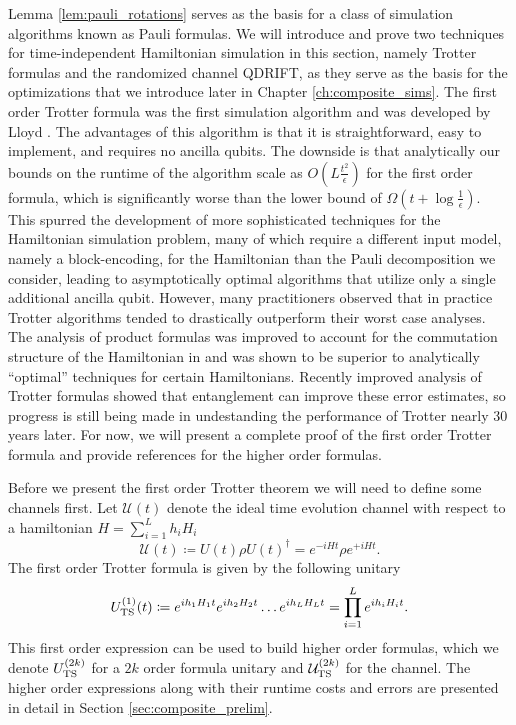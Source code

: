 Lemma \ref{lem:pauli_rotations} serves as the basis for a class of simulation algorithms known as Pauli formulas.
We will introduce and prove two techniques for time-independent Hamiltonian simulation in this section, namely Trotter formulas and the randomized channel QDRIFT, as they serve as the basis for the optimizations that we introduce later in Chapter \ref{ch:composite_sims}.
The first order Trotter formula was the first simulation algorithm and was developed by Lloyd \cite{lloyd1996universal}. 
The advantages of this algorithm is that it is straightforward, easy to implement, and requires no ancilla qubits. 
The downside is that analytically our bounds on the runtime of the algorithm scale as $O\left( L \frac{t^2}{\epsilon}\right)$ for the first order formula, which is significantly worse than the lower bound of $\Omega\left(t + \log \frac{1}{\epsilon} \right)$. 
This spurred the development of more sophisticated techniques for the Hamiltonian simulation problem, many of which require a different input model, namely a block-encoding, for the Hamiltonian than the Pauli decomposition we consider, leading to asymptotically optimal algorithms \cite{low2019hamiltonian} that utilize only a single additional ancilla qubit. However, many practitioners observed that in practice Trotter algorithms tended to drastically outperform their worst case analyses. The analysis of product formulas was improved to account for the commutation structure of the Hamiltonian in \cite{childs2021theory} and was shown to be superior to analytically ``optimal'' techniques for certain Hamiltonians. Recently improved analysis of Trotter formulas showed that entanglement can improve these error estimates, so progress is still being made in undestanding the performance of Trotter nearly 30 years later. For now, we will present a complete proof of the first order Trotter formula and provide references for the higher order formulas.

Before we present the first order Trotter theorem we will need to define some channels first. Let $\mathcal{U}(t)$ denote the ideal time evolution channel with respect to a hamiltonian $H = \sum_{i = 1}^L h_i H_i$
\begin{equation}
    \mathcal{U}(t) \coloneqq U(t) \rho U(t)^\dagger = e^{-i H t} \rho e^{+i H t}.
\end{equation}
The first order Trotter formula is given by the following unitary
\begin{equation}
    U_{\rm TS}^{(1)}(t) \coloneqq e^{i h_1 H_1 t}e^{i h_2 H_2 t} \ldots e^{i h_L H_L t} = \prod_{i = 1}^L e^{i h_i H_i t}.
\end{equation}
This first order expression can be used to build higher order formulas, which we denote $U_{\rm TS}^{(2k)}$ for a $2k$ order formula unitary and $\mathcal{U}_{\rm TS}^{(2k)}$ for the channel. The higher order expressions along with their runtime costs and errors are presented in detail in Section \ref{sec:composite_prelim}.


